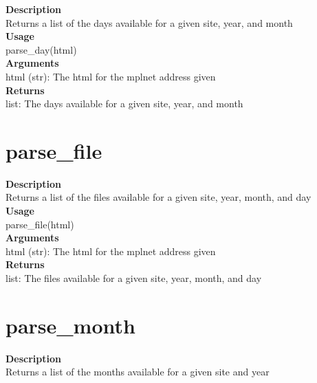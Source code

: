 \documentclass[11pt, oneside]{article}
\begin{document}
\textbf{Description} \\
        Returns a list of the days available for a given site, year, and month\\

\noindent\textbf{Usage} \\
        parse\_day(html) \\

\noindent\textbf{Arguments} \\
        html (str): The html for the mplnet address given\\

\noindent\textbf{Returns} \\
        list: The days available for a given site, year, and month\\


\section{parse\_file}

\textbf{Description} \\
        Returns a list of the files available for a given site, year, month, and day\\

\noindent\textbf{Usage} \\
        parse\_file(html) \\

\noindent\textbf{Arguments} \\
        html (str): The html for the mplnet address given\\

\noindent\textbf{Returns} \\
        list: The files available for a given site, year, month, and day\\


\section{parse\_month}

\textbf{Description} \\
        Returns a list of the months available for a given site and year\\
\end{document}

